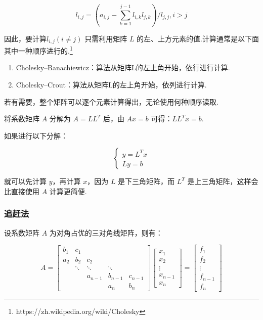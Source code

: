 \[
    l_{i,j} = (a_{i,j} - \sum_{k=1}^{j-1}l_{i,k}l_{j,k}) / l_{j,j},  i > j
\]

因此，要计算${l}_{i,j}(i\neq j)$ 只需利用矩阵 $L$ 的左、上方元素的值.计算通常是以下面其中一种顺序进行的.\footnote{https://zh.wikipedia.org/wiki/Cholesky}

\begin{enumerate}
    \item Cholesky–Banachiewicz：算法从矩阵L的左上角开始，依行进行计算.
    \item Cholesky–Crout：算法从矩阵L的左上角开始，依列进行计算.
\end{enumerate}

若有需要，整个矩阵可以逐个元素计算得出，无论使用何种顺序读取.

将系数矩阵 \(A\) 分解为 \(A = L L^T\) 后，由 \(Ax = b\)
可得：\(LL^Tx = b\).

如果进行以下分解：

\[
    \left\{\begin{matrix}
        y = L^Tx \\
        Ly = b
    \end{matrix}\right.
\]


就可以先计算 \(y\)，再计算 \(x\)，因为 \(L\) 是下三角矩阵，而 \(L^T\)
是上三角矩阵，这样会比直接使用 \(A\) 计算更简便.

\subsubsection{追赶法}

设系数矩阵 $A$ 为对角占优的三对角线矩阵，则有：

\begin{equation}
    A =
    \begin{bmatrix}
        b_1 & c_1                                  \\
        a_2 & b_2    & c_2                         \\
            & \ddots & \ddots  & \ddots            \\
            &        & a_{n-1} & b_{n-1} & c_{n-1} \\
            &        &         & a_n     & b_n
    \end{bmatrix}
    \begin{bmatrix}
        x_1     \\
        x_2     \\
        \vdots  \\
        x_{n-1} \\
        x_n
    \end{bmatrix}
    =
    \begin{bmatrix}
        f_1     \\
        f_2     \\
        \vdots  \\
        f_{n-1} \\
        f_n
    \end{bmatrix}
    \label{追赶法:三对角线方程组}
\end{equation}

